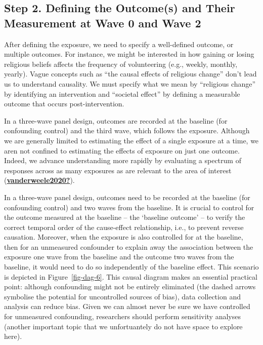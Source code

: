 \documentclass[
  singlecolumn]{report}
\begin{document}
\hypertarget{step-2.-defining-the-outcomes-and-their-measurement-at-wave-0-and-wave-2}{%
\subsection{Step 2. Defining the Outcome(s) and Their Measurement at
Wave 0 and Wave
2}\label{step-2.-defining-the-outcomes-and-their-measurement-at-wave-0-and-wave-2}}

After defining the exposure, we need to specify a well-defined outcome,
or multiple outcomes. For instance, we might be interested in how
gaining or losing religious beliefs affects the frequency of
volunteering (e.g., weekly, monthly, yearly). Vague concepts such as
``the causal effects of religious change'' don't lead us to understand
causality. We must specify what we mean by ``religious change'' by
identifying an intervention and ``societal effect'' by defining a
measurable outcome that occurs post-intervention.

In a three-wave panel design, outcomes are recorded at the baseline (for
confounding control) and the third wave, which follows the exposure.
Although we are generally limited to estimating the effect of a single
exposure at a time, we aren not confined to estimating the effects of
exposure on just one outcome. Indeed, we advance understanding more
rapidly by evaluating a spectrum of responses across as many exposures
as are relevant to the area of interest
(\protect\hyperlink{ref-vanderweele2020}{\textbf{vanderweele2020?}}).

In a three-wave panel design, outcomes need to be recorded at the
baseline (for confounding control) and two waves from the baseline. It
is crucial to control for the outcome measured at the baseline -- the
`baseline outcome' -- to verify the correct temporal order of the
cause-effect relationship, i.e., to prevent reverse causation. Moreover,
when the exposure is also controlled for at the baseline, then for an
unmeasured confounder to explain away the association between the
exposure one wave from the baseline and the outcome two waves from the
baseline, it would need to do so independently of the baseline effect.
This scenario is depicted in Figure~\ref{fig-dag-6}. This causal diagram
makes an essential practical point: although confounding might not be
entirely eliminated (the dashed arrows symbolise the potential for
uncontrolled sources of bias), data collection and analysis can reduce
bias. Given we can almost never be sure we have controlled for
unmeasured confounding, researchers should perform sensitivity analyses
(another important topic that we unfortuantely do not have space to
explore here).
\end{document}
